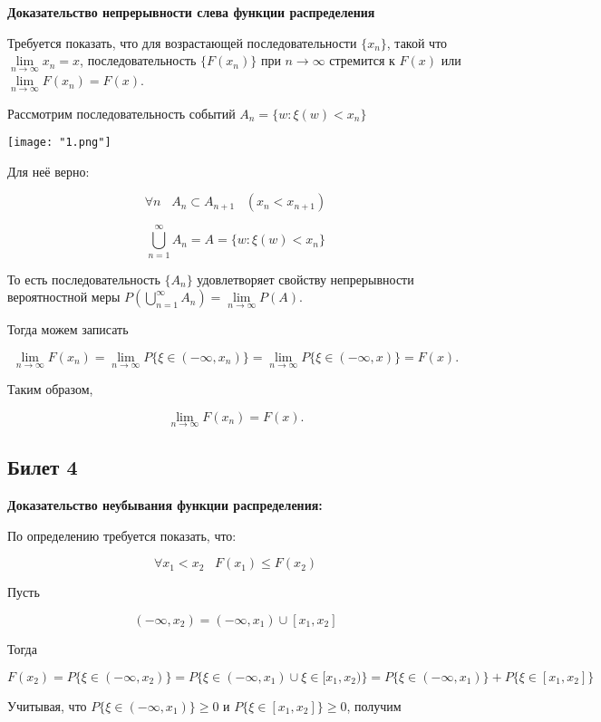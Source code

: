 \textbf{Доказательство непрерывности слева функции 
распределения}
\smallskip

Требуется показать, что для возрастающей последовательности
$\{x_n\}$, такой что $\lim\limits_{n \to \infty} x_n = x$,
последовательность $\{F(x_n)\}$ при $n \to \infty$ стремится
к $F(x)$ или $\lim\limits_{n \to \infty} F(x_n) = F(x)$.
\smallskip

Рассмотрим последовательность событий $A_n = \{w : \xi(w) <
x_n\}$

\texttt{[image: "1.png"]}

Для неё верно:

\[
    \forall n \;\;\; A_n \subset  A_{n + 1} \;\;\; (x_n < x_{n + 1})  
\]

\[
    \bigcup\limits_{n = 1}^{\infty} A_n = A = \{w : \xi(w) < x_n\}  
\]

То есть последовательность $\{A_n\}$ удовлетворяет свойству
непрерывности вероятностной меры $P\left(\bigcup\limits_{n = 1}^{\infty} A_n\right) =
\lim\limits_{n \to \infty} P(A)$.

Тогда можем записать

\[
    \lim\limits_{n \to \infty} F(x_n) = \lim\limits_{n \to \infty}
    P\{\xi \in (-\infty, x_n)\} = \lim\limits_{n \to \infty}
    P\{\xi \in (-\infty, x)\} = F(x).
\]

Таким образом,

\[
    \lim\limits_{n \to \infty} F(x_n) = F(x).
\]
\bigskip

\subsection{Билет 4}      

\textbf{Доказательство неубывания функции распределения:}
\smallskip

По определению требуется показать, что:

\[
    \forall x_1 < x_2 \;\;\; F(x_1) \leq F(x_2)  
\]

Пусть 

\[
    (-\infty, x_2) = (-\infty, x_1) \cup [x_1, x_2]  
\]

Тогда

\[
    F(x_2) = P\{\xi \in (-\infty, x_2)\} =
    P\{\xi \in (-\infty, x_1)
    \cup \xi \in [x_1, x_2)\} = P\{\xi \in (-\infty, x_1)\} +
    P\{\xi \in [x_1, x_2]\}  
\]

Учитывая, что $P\{\xi \in (-\infty, x_1)\} \geq 0$ и 
$P\{\xi \in [x_1, x_2]\} \geq 0$, получим

